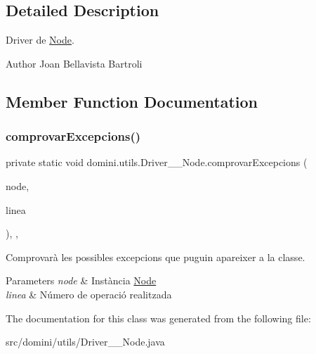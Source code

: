 \subsection{Detailed Description}
Driver de \hyperlink{classdomini_1_1utils_1_1Node}{Node}. 

\begin{DoxyAuthor}{Author}
Joan Bellavista Bartroli 
\end{DoxyAuthor}


\subsection{Member Function Documentation}
\mbox{\label{classdomini_1_1utils_1_1Driver____Node_a9fdd311953250227bb70d67cbf20bbb4}} 
\subsubsection{\texorpdfstring{comprovar\+Excepcions()}{comprovarExcepcions()}}
{\footnotesize\ttfamily private static void domini.\+utils.\+Driver\+\_\+\+\_\+\+Node.\+comprovar\+Excepcions (\begin{DoxyParamCaption}\item[{\hyperlink{classdomini_1_1utils_1_1Node}{Node}}]{node,  }\item[{String}]{linea }\end{DoxyParamCaption})\hspace{0.3cm}{\ttfamily [inline]}, {\ttfamily [static]}, {\ttfamily [private]}}



Comprovarà les possibles excepcions que puguin apareixer a la classe. 


\begin{DoxyParams}{Parameters}
{\em node} & Instància \hyperlink{classdomini_1_1utils_1_1Node}{Node} \\
\hline
{\em linea} & Número de operació realitzada \\
\hline
\end{DoxyParams}


The documentation for this class was generated from the following file\+:\begin{DoxyCompactItemize}
\item 
src/domini/utils/Driver\+\_\+\+\_\+\+Node.\+java\end{DoxyCompactItemize}
